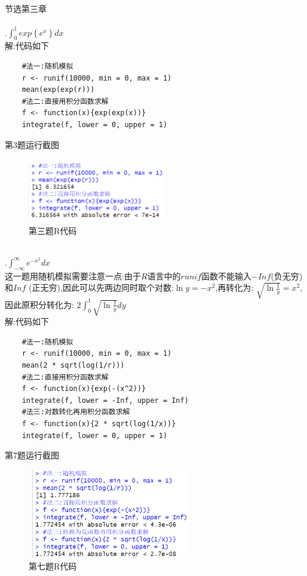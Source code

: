 \documentclass{book}
\begin{document}
\centering
节选第三章 \\

\hspace*{\fill} \\

\justifying
{}.$\int_{0}^{1}exp\left\{e^{x}\right\}dx$ \\
\noindent
解:代码如下
\lstset{language = R}
\begin{lstlisting}
    #法一:随机模拟
    r <- runif(10000, min = 0, max = 1)
    mean(exp(exp(r)))
    #法二:直接用积分函数求解
    f <- function(x){exp(exp(x))}
    integrate(f, lower = 0, upper = 1)
\end{lstlisting}
第3题运行截图
\begin{figure}[H]
    \centering
    \includegraphics*[height = 2.8cm, width = 6cm]{gramFile/第三题运行截图.PNG}
    \caption{第三题R代码}
\end{figure}

\hspace*{\fill} \\

.$\int_{-\infty}^{\infty}e^{-x^{2}}dx$ \\
这一题用随机模拟需要注意一点:由于$R$语言中的$runif$函数不能输入$-Inf$(负无穷)和$Inf$
(正无穷),因此可以先两边同时取个对数:$\ln{y} = -x^2$,再转化为:
$\sqrt{\ln{\frac{1}{y}}} = x^2$,因此原积分转化为:
$2\int_{0}^{1}\sqrt{\ln\frac{1}{y}}dy$ \\
解:代码如下
\lstset{language = R}
\begin{lstlisting}
    #法一:随机模拟
    r <- runif(10000, min = 0, max = 1)
    mean(2 * sqrt(log(1/r)))
    #法二:直接用积分函数求解
    f <- function(x){exp(-(x^2))}
    integrate(f, lower = -Inf, upper = Inf)
    #法三:对数转化再用积分函数求解
    f <- function(x){2 * sqrt(log(1/x))}
    integrate(f, lower = 0, upper = 1)
\end{lstlisting}
第7题运行截图
\begin{figure}[H]
    \centering
    \includegraphics*[height = 3.9cm, width = 7.2cm]{gramFile/第七题运行截图.PNG}
    \caption{第七题R代码}
\end{figure}
\end{document}
